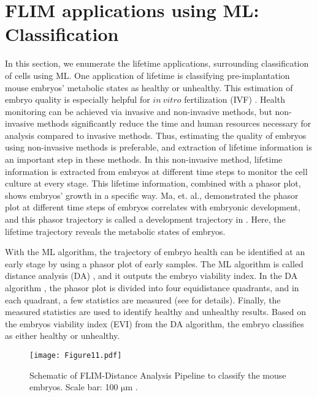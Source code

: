 \documentclass[12pt]{iopart}
\begin{document}
\section{FLIM applications using ML: Classification} \label{sec2}
In this section, we enumerate the lifetime applications, surrounding classification of cells using ML. One application of lifetime is classifying pre-implantation mouse embryos' metabolic states as healthy or unhealthy. This estimation of embryo quality is especially helpful for $in~vitro$ fertilization (IVF) \cite{label}. Health monitoring can be achieved via invasive and non-invasive methods, but non-invasive methods significantly reduce the time and human resources necessary for analysis compared to invasive methods. Thus, estimating the quality of embryos using non-invasive methods is preferable, and extraction of lifetime information is an important step in these methods. In this non-invasive method, lifetime information is extracted from embryos at different time steps to monitor the cell culture at every stage. This lifetime information, combined with a phasor plot, shows embryos' growth in a specific way. Ma, et. al., demonstrated the phasor plot at different time steps of embryos correlates with embryonic development, and this phasor trajectory is called a development trajectory in \cite{label}. Here, the lifetime trajectory reveals the metabolic states of embryos.

With the ML algorithm, the trajectory of embryo health can be identified at an early stage by using a phasor plot of early samples. The ML algorithm is called distance analysis (DA) \cite{distance_analysis}, and it outputs the embryo viability index. In the DA algorithm \cite{distance_analysis}, the phasor plot is divided into four equidistance quadrants, and in each quadrant, a few statistics are measured (see \cite{distance_analysis} for details). Finally, the measured statistics are used to identify healthy and unhealthy results. Based on the embryos viability index (EVI) from the DA algorithm, the embryo classifies as either healthy or unhealthy. 

\begin{figure}[!t]
\centering
\texttt{[image: Figure11.pdf]}
\caption{Schematic of FLIM-Distance Analysis Pipeline to classify the mouse embryos. Scale bar: 100 $\mathrm{\mu}$m \cite{label}.}\label{fig1_labels1}
\end{figure}
\end{document}
